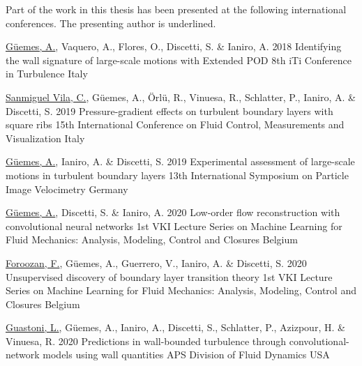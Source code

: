 %
\clearpage
\begin{conferences}
	Part of the work in this thesis has been presented at the following international conferences.
	The presenting author is underlined.

  \conferenceitem%
    {\underline{Güemes, A.}, Vaquero, A., Flores, O., Discetti, S. \& Ianiro, A.}%
    {2018}%
    {Identifying the wall signature of large-scale motions with Extended POD}%
    {8th iTi Conference in Turbulence}%
    {Italy}%

  \conferenceitem%
    {\underline{Sanmiguel Vila, C.}, Güemes, A., Örlü, R., Vinuesa, R., Schlatter, P., Ianiro, A. \& Discetti, S.}%
    {2019}%
    {Pressure-gradient effects on turbulent boundary layers with square ribs}%
    {15th International Conference on Fluid Control, Measurements and Visualization}%
    {Italy}%

  \conferenceitem%
    {\underline{Güemes, A.}, Ianiro, A. \& Discetti, S.}%
    {2019}%
    {Experimental assessment of large-scale motions in turbulent boundary layers}%
    {13th International Symposium on Particle Image Velocimetry}%
    {Germany}%

  \conferenceitem%
    {\underline{Güemes, A.}, Discetti, S. \& Ianiro, A.}%
    {2020}%
    {Low-order flow reconstruction with convolutional neural networks}%
    {1st VKI Lecture Series on Machine Learning for Fluid Mechanics: Analysis, Modeling, Control and Closures}%
    {Belgium}%

  \conferenceitem%
    {\underline{Foroozan, F.}, Güemes, A., Guerrero, V., Ianiro, A. \& Discetti, S.}%
    {2020}%
    {Unsupervised discovery of boundary layer transition theory}%
    {1st VKI Lecture Series on Machine Learning for Fluid Mechanics: Analysis, Modeling, Control and Closures}%
    {Belgium}%

	\conferenceitem%
    {\underline{Guastoni, L.}, Güemes, A., Ianiro, A., Discetti, S., Schlatter, P., Azizpour, H. \& Vinuesa, R.}%
    {2020}%
    {Predictions in wall-bounded turbulence through convolutional-network models using wall quantities}%
    {APS Division of Fluid Dynamics}%
    {USA}%


\end{conferences}
